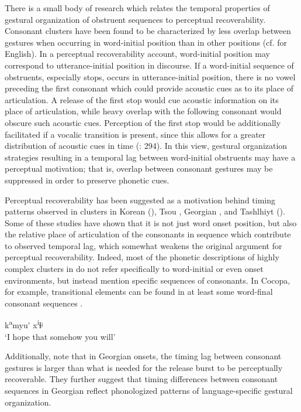   There is a small body of research which relates the temporal properties of gestural organization of obstruent sequences to perceptual recoverability. Consonant clusters have been found to be characterized by less overlap between gestures when occurring in word-initial position than in other positions (cf. \citealt{Byrd1996a} for English). In a perceptual recoverability account, word-initial position may correspond to utterance-initial position in discourse. If a word-initial sequence of obstruents, especially stops, occurs in utterance-initial position, there is no vowel preceding the first consonant which could provide acoustic cues as to its place of articulation. A release of the first stop would cue acoustic information on its place of articulation, while heavy overlap with the following consonant would obscure such acoustic cues. Perception of the first stop would be additionally facilitated if a vocalic transition is present, since this allows for a greater distribution of acoustic cues in time (\citealt{RidouaneFougeron2011}: 294). In this view, gestural organization strategies resulting in a temporal lag between word-initial obstruents may have a perceptual motivation; that is, overlap between consonant gestures may be suppressed in order to preserve phonetic cues.

  Perceptual recoverability has been suggested as a motivation behind timing patterns observed in clusters in Korean (\citealt{SilvermanJun1994}), Tsou \citep{Wright1996}, Georgian \citep{ChitoranEtAl2002}, and Tashlhiyt (\citealt{RidouaneFougeron2011}). Some of these studies have shown that it is not just word onset position, but also the relative place of articulation of the consonants in sequence which contribute to observed temporal lag, which somewhat weakens the original argument for perceptual recoverability. Indeed, most of the phonetic descriptions of highly complex clusters in  do not refer specifically to word-initial or even onset environments, but instead mention specific sequences of consonants. In Cocopa, for example, transitional elements can be found in at least some word-final consonant sequences .

\ea\label{ex:8.9}

k\textsuperscript{a}myu\'{} x\textsuperscript{i}ɬʲ\\
\glt ‘I hope that somehow you will’
\citep[47]{Crawford1966}
\z

Additionally, \citet{ChitoranCohn2009} note that in Georgian onsets, the timing lag between consonant gestures is larger than what is needed for the release burst to be perceptually recoverable. They further suggest that timing differences between consonant sequences in Georgian reflect phonologized patterns of language-specific gestural organization.

